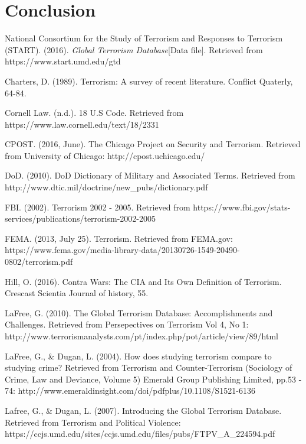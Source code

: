 \documentclass[10pt,a4paper]{article}
\begin{document}
\section{Conclusion} 


\pagebreak
\begin{thebibliography}{9}

National Consortium for the Study of Terrorism and Responses to Terrorism (START). 
(2016). \textit{Global Terrorism Database}[Data file].
Retrieved from https://www.start.umd.edu/gtd

Charters, D. (1989). Terrorism: A survey of recent literature. Conflict Quaterly, 64-84.

Cornell Law. (n.d.). 18 U.S Code. Retrieved from https://www.law.cornell.edu/text/18/2331

CPOST. (2016, June). The Chicago Project on Security and Terrorism. 
Retrieved from University of Chicago: http://cpost.uchicago.edu/

DoD. (2010). DoD Dictionary of Military and Associated Terms. 
Retrieved from http://www.dtic.mil/doctrine/new\_pubs/dictionary.pdf

FBI. (2002). Terrorism 2002 - 2005. 
Retrieved from https://www.fbi.gov/stats-services/publications/terrorism-2002-2005

FEMA. (2013, July 25). Terrorism. 
Retrieved from FEMA.gov: https://www.fema.gov/media-library-data/20130726-1549-20490-0802/terrorism.pdf

Hill, O. (2016). Contra Wars: The CIA and Its Own Definition of Terrorism. Crescast Scientia Journal of history, 55.

LaFree, G. (2010). The Global Terrorism Database: Accomplishments and Challenges. 
Retrieved from Persepectives on Terrorism Vol 4, No 1: http://www.terrorismanalysts.com/pt/index.php/pot/article/view/89/html

LaFree, G., \& Dugan, L. (2004). How does studying terrorism compare to studying crime? 
Retrieved from Terrorism and Counter-Terrorism (Sociology of Crime, Law and Deviance, Volume 5) Emerald Group Publishing Limited, pp.53 - 74: http://www.emeraldinsight.com/doi/pdfplus/10.1108/S1521-6136%

Lafree, G., \& Dugan, L. (2007). Introducing the Global Terrorism Database. 
Retrieved from Terrorism and Political Violence: https://ccjs.umd.edu/sites/ccjs.umd.edu/files/pubs/FTPV\_A\_224594.pdf


\end{thebibliography}
\end{document}

